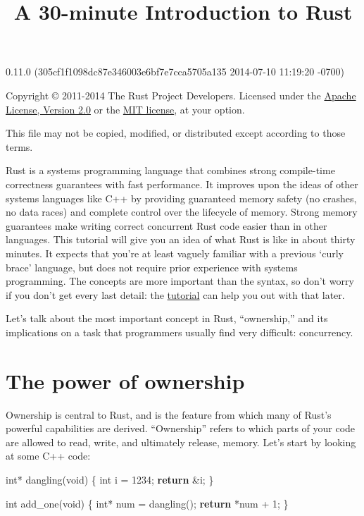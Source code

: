 \documentclass[]{article}
\title{A 30-minute Introduction to Rust}
\newenvironment{Shaded}{}{}
\newcommand{\KeywordTok}[1]{\textcolor[rgb]{0.00,0.44,0.13}{\textbf{{#1}}}}
\newcommand{\DataTypeTok}[1]{\textcolor[rgb]{0.56,0.13,0.00}{{#1}}}
\newcommand{\DecValTok}[1]{\textcolor[rgb]{0.25,0.63,0.44}{{#1}}}
\newcommand{\NormalTok}[1]{{#1}}
\begin{document}
\maketitle

0.11.0 (305cf1f1098dc87e346003e6bf7e7cca5705a135 2014-07-10 11:19:20 -0700)

Copyright © 2011-2014 The Rust Project Developers. Licensed under the
\href{http://www.apache.org/licenses/LICENSE-2.0}{Apache License,
Version 2.0} or the \href{http://opensource.org/licenses/MIT}{MIT
license}, at your option.

This file may not be copied, modified, or distributed except according
to those terms.

{
\hypersetup{linkcolor=black}
\setcounter{tocdepth}{3}
\tableofcontents
}
Rust is a systems programming language that combines strong compile-time
correctness guarantees with fast performance. It improves upon the ideas
of other systems languages like C++ by providing guaranteed memory
safety (no crashes, no data races) and complete control over the
lifecycle of memory. Strong memory guarantees make writing correct
concurrent Rust code easier than in other languages. This tutorial will
give you an idea of what Rust is like in about thirty minutes. It
expects that you're at least vaguely familiar with a previous `curly
brace' language, but does not require prior experience with systems
programming. The concepts are more important than the syntax, so don't
worry if you don't get every last detail: the
\href{tutorial.html}{tutorial} can help you out with that later.

Let's talk about the most important concept in Rust, ``ownership,'' and
its implications on a task that programmers usually find very difficult:
concurrency.

\section{The power of ownership}\label{the-power-of-ownership}

Ownership is central to Rust, and is the feature from which many of
Rust's powerful capabilities are derived. ``Ownership'' refers to which
parts of your code are allowed to read, write, and ultimately release,
memory. Let's start by looking at some C++ code:

\begin{Shaded}
\begin{Highlighting}[]
\DataTypeTok{int}\NormalTok{* dangling(}\DataTypeTok{void}\NormalTok{)}
\NormalTok{\{}
    \DataTypeTok{int} \NormalTok{i = }\DecValTok{1234}\NormalTok{;}
    \KeywordTok{return} \NormalTok{&i;}
\NormalTok{\}}

\DataTypeTok{int} \NormalTok{add_one(}\DataTypeTok{void}\NormalTok{)}
\NormalTok{\{}
    \DataTypeTok{int}\NormalTok{* num = dangling();}
    \KeywordTok{return} \NormalTok{*num + }\DecValTok{1}\NormalTok{;}
\NormalTok{\}}
\end{Highlighting}
\end{Shaded}
\end{document}
